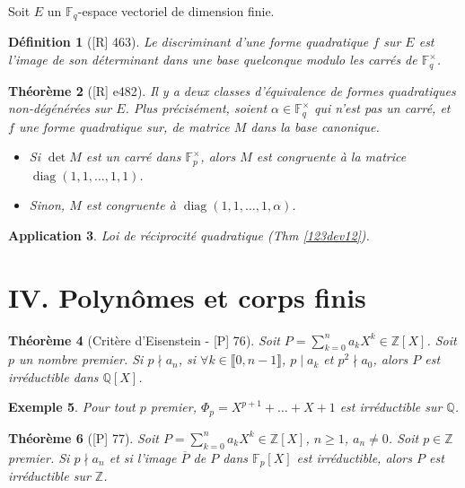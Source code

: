 \documentclass[10pt, a4paper, parskip=full, twoside, twocolumn]{report}
\newtheorem{definition}{Définition}
\newtheorem{theorem}[definition]{Théorème}
\newtheorem{example}[definition]{Exemple}
\newtheorem{application}[definition]{Application}
\newcommand{\IZ}{\mathbb{Z}}
\newcommand{\IQ}{\mathbb{Q}}
\newcommand{\IF}{\mathbb{F}}
\DeclareMathOperator{\diag}{diag}
\begin{document}
\textcolor{paragraphtext}{Soit $E$ un $\IF_q$-espace vectoriel de dimension finie.}

\begin{definition}[\textnormal{[R] 463}]
	Le \emph{discriminant} d'une forme quadratique $f$ sur $E$ est l'image de son déterminant dans une base quelconque modulo les carrés de $\IF_q^{\times}$.
\end{definition}

\begin{theorem}[\textnormal{[R] e482}]
	Il y a deux classes d'équivalence de formes quadratiques non-dégénérées sur $E$.
	Plus précisément, soient $\alpha\in\IF_q^{\times}$ qui n'est pas un carré, et $f$ une forme 
	quadratique sur, de matrice $M$ dans la base canonique.

	\begin{itemize}
		\item Si $\det M$ est un carré dans $\IF_p^{\times}$, alors $M$ est congruente à la matrice $\diag(1,1,\dots, 1,1)$.
		\item Sinon, $M$ est congruente à $\diag(1,1,\dots, 1, \alpha)$.
	\end{itemize}
\end{theorem}

\begin{application}
	Loi de réciprocité quadratique (Thm \ref{123dev12}).
\end{application}

\section*{IV. Polynômes et corps finis}

\begin{theorem}[Critère d'Eisenstein - \textnormal{[P] 76}]
	Soit $P = \sum_{k=0}^{n} a_kX^k\in\IZ[X]$.
	Soit $p$ un nombre premier. Si $p\nmid a_n$, si $\forall k\in \llbracket 0, n-1\rrbracket$, $p\mid a_k$ et $p^2\nmid a_0$, alors $P$ est irréductible dans $\IQ[X]$.
\end{theorem}

\begin{example}
	Pour tout $p$ premier, $\Phi_p = X^{p+1} + \dots + X + 1$ est irréductible sur $\IQ$.
\end{example}

\begin{theorem}[\textnormal{[P] 77}]
	Soit $P = \sum_{k=0}^{n} a_kX^k\in\IZ[X]$, $n\geq 1$, $a_n\neq 0$.
	Soit $p\in\IZ$ premier. Si $p\nmid a_n$ et si l'image $\overline{P}$ de $P$ 
	dans $\IF_p[X]$ est irréductible, alors $P$ est irréductible sur $\IZ$.
\end{theorem}
\end{document}
